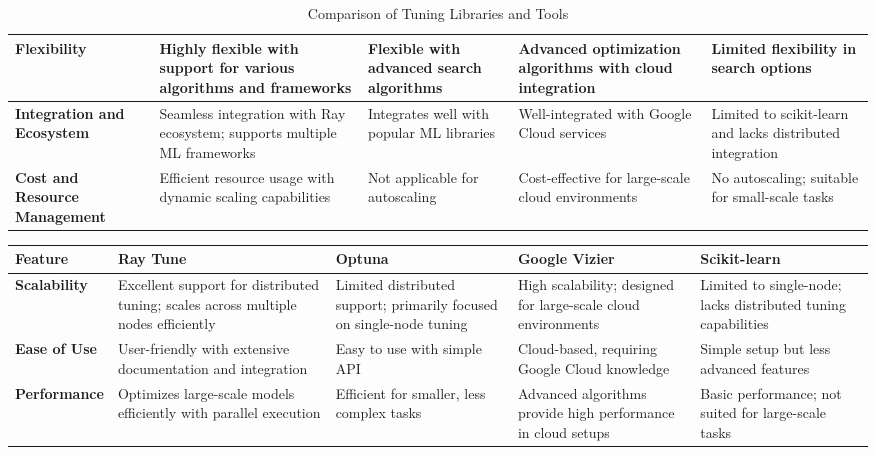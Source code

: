 \begin{table}[ht]
\centering
\begin{tabular}{|p{2.5cm}|p{2.8cm}|p{2.8cm}|p{2.8cm}|p{2.8cm}|}
\hline
\textbf{Flexibility} & Highly flexible with support for various algorithms and frameworks \cite{anyscale_ray_tune} & Flexible with advanced search algorithms \cite{akiba2019optuna} & Advanced optimization algorithms with cloud integration \cite{google_vizier} & Limited flexibility in search options \cite{scikit_learn} \\ 
\hline
\textbf{Integration and Ecosystem} & Seamless integration with Ray ecosystem; supports multiple ML frameworks \cite{anyscale_ray_tune} & Integrates well with popular ML libraries \cite{akiba2019optuna} & Well-integrated with Google Cloud services \cite{google_vizier} & Limited to scikit-learn and lacks distributed integration \cite{scikit_learn} \\ 
\hline
\textbf{Cost and Resource Management} & Efficient resource usage with dynamic scaling capabilities \cite{anyscale_ray_tune} & Not applicable for autoscaling \cite{akiba2019optuna} & Cost-effective for large-scale cloud environments \cite{google_vizier} & No autoscaling; suitable for small-scale tasks \cite{scikit_learn} \\ 

\hline
\end{tabular}
\caption{Comparison of Tuning Libraries and Tools}
\label{tab:tuning_libraries_comparison}
\end{table}



\begin{table}[h]
\centering
\begin{tabular}{|p{2.5cm}|p{2.8cm}|p{2.8cm}|p{2.8cm}|p{2.8cm}|}
\hline
\textbf{Feature} & \textbf{Ray Tune} & \textbf{Optuna} & \textbf{Google Vizier} & \textbf{Scikit-learn} \\ 
\hline
\textbf{Scalability} & Excellent support for distributed tuning; scales across multiple nodes efficiently \cite{anyscale_ray_tune} & Limited distributed support; primarily focused on single-node tuning \cite{akiba2019optuna}  & High scalability; designed for large-scale cloud environments \cite{google_vizier} & Limited to single-node; lacks distributed tuning capabilities \cite{scikit_learn} \\ 
\hline
\textbf{Ease of Use} & User-friendly with extensive documentation and integration \cite{anyscale_ray_tune} & Easy to use with simple API \cite{akiba2019optuna} & Cloud-based, requiring Google Cloud knowledge \cite{google_vizier} & Simple setup but less advanced features \cite{scikit_learn} \\ 
\hline
\textbf{Performance} & Optimizes large-scale models efficiently with parallel execution \cite{anyscale_ray_tune} & Efficient for smaller, less complex tasks \cite{akiba2019optuna}  & Advanced algorithms provide high performance in cloud setups \cite{google_vizier} & Basic performance; not suited for large-scale tasks \cite{scikit_learn} \\ 
\hline
\end{tabular}
\end{table}

